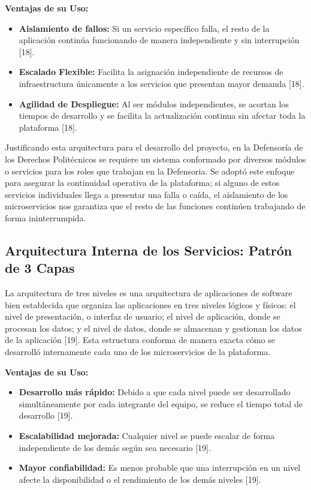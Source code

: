 \textbf{Ventajas de su Uso:}
\begin{itemize}
    \item \textbf{Aislamiento de fallos:} Si un servicio específico falla, el resto de la aplicación continúa funcionando de manera independiente y sin interrupción [18].
    \item \textbf{Escalado Flexible:} Facilita la asignación independiente de recursos de infraestructura únicamente a los servicios que presentan mayor demanda [18].
    \item \textbf{Agilidad de Despliegue:} Al ser módulos independientes, se acortan los tiempos de desarrollo y se facilita la actualización continua sin afectar toda la plataforma [18].
\end{itemize}

Justificando esta arquitectura para el desarrollo del proyecto, en la Defensoría de los Derechos Politécnicos se requiere un sistema conformado por diversos módulos o servicios para los roles que trabajan en la Defensoria. Se adoptó este enfoque para asegurar la continuidad operativa de la plataforma; si alguno de estos servicios individuales llega a presentar una falla o caída, el aislamiento de los microservicios nos garantiza que el resto de las funciones continúen trabajando de forma ininterrumpida.

\subsection{Arquitectura Interna de los Servicios: Patrón de 3 Capas}
La arquitectura de tres niveles es una arquitectura de aplicaciones de software bien establecida que organiza las aplicaciones en tres niveles lógicos y físicos: el nivel de presentación, o interfaz de usuario; el nivel de aplicación, donde se procesan los datos; y el nivel de datos, donde se almacenan y gestionan los datos de la aplicación [19]. Esta estructura conforma de manera exacta cómo se desarrolló internamente cada uno de los microservicios de la plataforma.

\textbf{Ventajas de su Uso:}
\begin{itemize}
    \item \textbf{Desarrollo más rápido:} Debido a que cada nivel puede ser desarrollado simultáneamente por cada integrante del equipo, se reduce el tiempo total de desarrollo [19].
    \item \textbf{Escalabilidad mejorada:} Cualquier nivel se puede escalar de forma independiente de los demás según sea necesario [19].
    \item \textbf{Mayor confiabilidad:} Es menos probable que una interrupción en un nivel afecte la disponibilidad o el rendimiento de los demás niveles [19].
\end{itemize}

